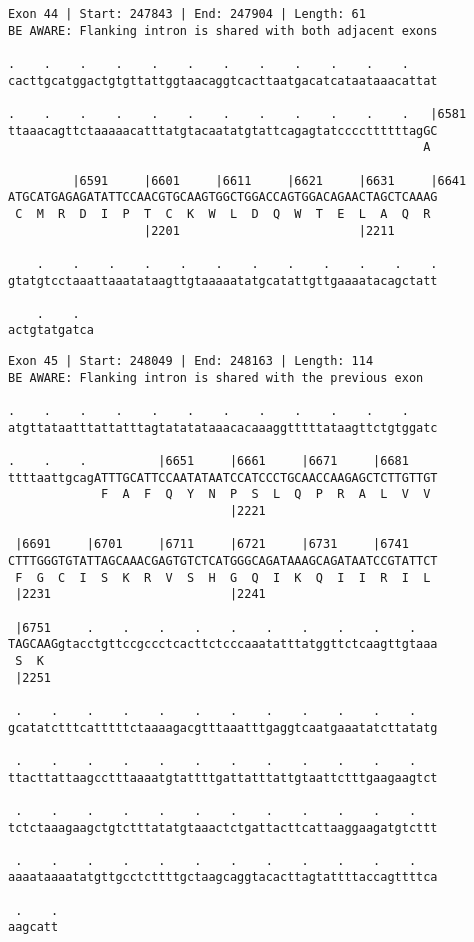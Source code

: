 \documentclass{article}
\begin{document}
\begin{Verbatim}
Exon 44 | Start: 247843 | End: 247904 | Length: 61
BE AWARE: Flanking intron is shared with both adjacent exons
 
.    .    .    .    .    .    .    .    .    .    .    .    
cacttgcatggactgtgttattggtaacaggtcacttaatgacatcataataaacattat
  
.    .    .    .    .    .    .    .    .    .    .    .   |6581
ttaaacagttctaaaaacatttatgtacaatatgtattcagagtatccccttttttagGC
                                                          A 
  
         |6591     |6601     |6611     |6621     |6631     |6641
ATGCATGAGAGATATTCCAACGTGCAAGTGGCTGGACCAGTGGACAGAACTAGCTCAAAG
 C  M  R  D  I  P  T  C  K  W  L  D  Q  W  T  E  L  A  Q  R 
                   |2201                         |2211      
  
    .    .    .    .    .    .    .    .    .    .    .    .
gtatgtcctaaattaaatataagttgtaaaaatatgcatattgttgaaaatacagctatt
  
    .    .  
actgtatgatca
\end{Verbatim}
\newpage
\begin{Verbatim}
Exon 45 | Start: 248049 | End: 248163 | Length: 114
BE AWARE: Flanking intron is shared with the previous exon
 
.    .    .    .    .    .    .    .    .    .    .    .    
atgttataatttattatttagtatatataaacacaaaggtttttataagttctgtggatc
  
.    .    .          |6651     |6661     |6671     |6681    
ttttaattgcagATTTGCATTCCAATATAATCCATCCCTGCAACCAAGAGCTCTTGTTGT
             F  A  F  Q  Y  N  P  S  L  Q  P  R  A  L  V  V 
                               |2221                        
  
 |6691     |6701     |6711     |6721     |6731     |6741    
CTTTGGGTGTATTAGCAAACGAGTGTCTCATGGGCAGATAAAGCAGATAATCCGTATTCT
 F  G  C  I  S  K  R  V  S  H  G  Q  I  K  Q  I  I  R  I  L 
 |2231                         |2241                        
  
 |6751     .    .    .    .    .    .    .    .    .    .   
TAGCAAGgtacctgttccgccctcacttctcccaaatatttatggttctcaagttgtaaa
 S  K                                                       
 |2251                                                      
  
 .    .    .    .    .    .    .    .    .    .    .    .   
gcatatctttcatttttctaaaagacgtttaaatttgaggtcaatgaaatatcttatatg
  
 .    .    .    .    .    .    .    .    .    .    .    .   
ttacttattaagcctttaaaatgtattttgattatttattgtaattctttgaagaagtct
  
 .    .    .    .    .    .    .    .    .    .    .    .   
tctctaaagaagctgtctttatatgtaaactctgattacttcattaaggaagatgtcttt
  
 .    .    .    .    .    .    .    .    .    .    .    .   
aaaataaaatatgttgcctcttttgctaagcaggtacacttagtattttaccagttttca
  
 .    .
aagcatt
\end{Verbatim}
\end{document}

